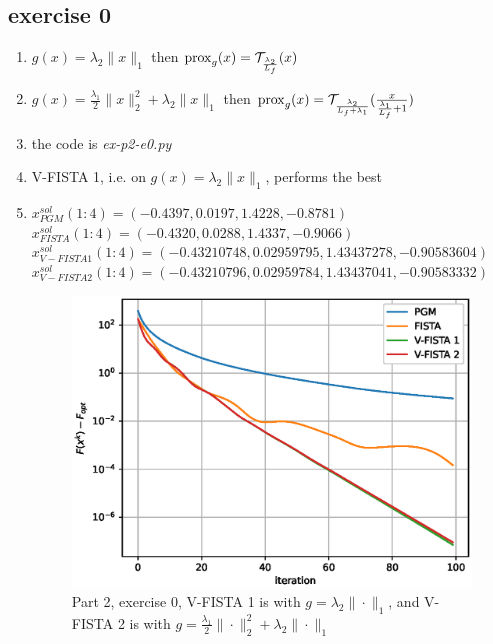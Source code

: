 
\subsection{exercise 0}
\begin{enumerate}
    \item $g(x) = \lambda_2\|x\|_1$ then $\operatorname{prox}_g(x)= \mathcal{T}_{\frac{\lambda_2}{L_f}}(x)$
    \item $g(x) = \frac{\lambda_1}{2}\|x\|^2_2 + \lambda_2\|x\|_1$ then $\operatorname{prox}_g(x)= \mathcal{T}_{\frac{\lambda_2}{L_f+\lambda_1}}(\frac{x}{\frac{\lambda_1}{L_f}+1})$
    \item the code is \emph{ex-p2-e0.py}
    \item V-FISTA 1, i.e. on $g(x) = \lambda_2 \|x\|_1$, performs the best
    \item $x^{sol}_{PGM}(1:4)=(-0.4397, 0.0197, 1.4228, -0.8781)$\\
     $x^{sol}_{FISTA}(1:4)=(-0.4320, 0.0288, 1.4337, -0.9066)$\\
     $x^{sol}_{V-FISTA 1}(1:4)=(-0.43210748, 0.02959795, 1.43437278, -0.90583604)$\\
     $x^{sol}_{V-FISTA 2}(1:4)=(-0.43210796, 0.02959784, 1.43437041, -0.90583332)$
    \begin{figure}[h]
        \centering
        \includegraphics[scale=0.5]{codes/result_images/ex_p2_e0_results.eps}
        \caption{Part 2, exercise 0, V-FISTA 1 is with $g=\lambda_2\|\cdot\|_1$, and V-FISTA 2 is with $g=\frac{\lambda_1}{2} \|\cdot\|^2_2 + \lambda_2\|\cdot\|_1$}
        \label{fig:p2e0}
    \end{figure}
\end{enumerate}




